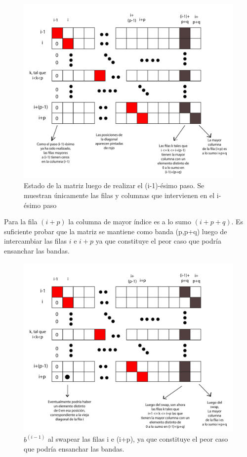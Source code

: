 \begin{figure}[!h]
	\begin{center}
		  \includegraphics[scale=0.5]{Imagenes/im_8.pdf}
		  \caption{Estado de la matriz luego de realizar el (i-1)-ésimo paso. Se muestran únicamente
		  las filas y columnas que intervienen en el i-ésimo paso}
		  \label{fig:contra1}
	\end{center}
\end{figure}
\FloatBarrier

Para la fila $(i+p)$ la columna de mayor índice es a lo sumo $(i+p+q)$. Es suficiente probar que la matriz se mantiene como 
banda (p,p+q) luego de intercambiar las filas $i$ e $i+p$ ya que constituye el peor caso que podría ensanchar las bandas.

\begin{figure}[!h]
	\begin{center}
		  \includegraphics[scale=0.5]{Imagenes/im_9.pdf}
		  \caption{$b^{(i-1)}$ al swapear las filas i e (i+p), ya que constituye el peor caso que podría ensanchar
		  las bandas.}
		  \label{fig:contra1}
	\end{center}
\end{figure}

